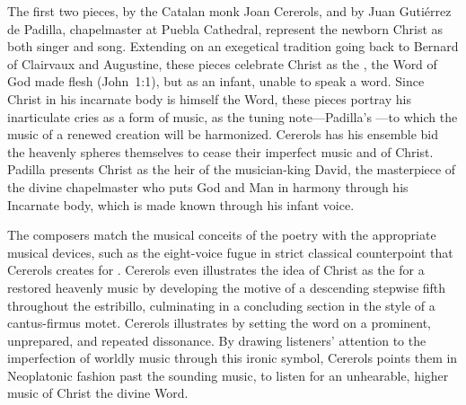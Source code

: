 The first two pieces,  by the Catalan monk Joan Cererols, and  by Juan Gutiérrez de Padilla, chapelmaster at Puebla Cathedral, represent the newborn Christ as both singer and song. 
Extending on an exegetical tradition going back to Bernard of Clairvaux and Augustine, these pieces celebrate Christ as the , the Word of God made flesh (John~1:1), but as an infant, unable to speak a word. 
Since Christ in his incarnate body is himself the Word, these pieces portray his inarticulate cries as a form of music, as the tuning note---Padilla's ---to which the music of a renewed creation will be harmonized.
Cererols has his ensemble bid the heavenly spheres themselves to cease their imperfect music and  of Christ.
Padilla presents Christ as the heir of the musician-king David, the masterpiece of the divine chapelmaster who puts God and Man in harmony through his Incarnate body, which is made known through his infant voice.

The composers match the musical conceits of the poetry with the appropriate musical devices, such as the eight-voice fugue in strict classical counterpoint that Cererols creates for .
Cererols even illustrates the idea of Christ as the  for a restored heavenly music by developing the motive of a descending stepwise fifth throughout the estribillo, culminating in a concluding section in the style of a cantus-firmus motet.
Cererols illustrates  by setting the word  on a prominent, unprepared, and repeated dissonance.
By drawing listeners' attention to the imperfection of worldly music through this ironic symbol, Cererols points them in Neoplatonic fashion past the sounding music, to listen for an unhearable, higher music of Christ the divine Word.

